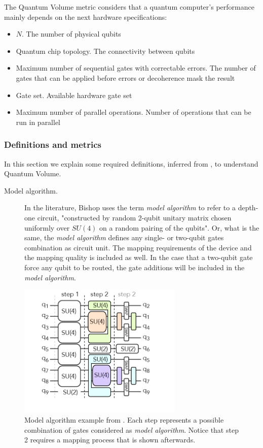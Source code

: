 \documentclass[11pt]{article}
\begin{document}
The Quantum Volume metric considers that a quantum computer's performance mainly depends on the next hardware specifications:

\begin{itemize}
\item \(N\). The number of physical qubits
\item Quantum chip topology. The connectivity between qubits
\item Maximum number of sequential gates with correctable errors. The number of gates that can be applied before errors or decoherence mask the result
\item Gate set. Available hardware gate set
\item Maximum number of parallel operations. Number of operations that can be run in parallel
\end{itemize}

\subsubsection{Definitions and metrics}
\label{sec:org78619bb}

In this section we explain some required definitions, inferred from \cite{Bishop_2017,Moll_2018}, to understand Quantum Volume.


\begin{description}
\item[{Model algorithm.}] In the literature, Bishop uses the term \emph{model algorithm} \cite{Bishop_2017} to refer to a depth-one circuit, "constructed by random 2-qubit unitary matrix chosen uniformly over \(SU (4)\) on a random pairing of the qubits". Or, what is the same, the \emph{model algorithm} defines any single- or two-qubit gates combination as circuit unit. The mapping requirements of the device and the mapping quality is included as well. In the case that a two-qubit gate force any qubit to be routed, the gate additions will be included in the \emph{model algorithm}.
\end{description}

\begin{figure}[htbp]
\centering
\includegraphics[width=0.7\textwidth]{model_algorithm.png}
\caption{\label{fig:org7953257}
Model algorithm example from \cite{Moll_2018}. Each step represents a possible combination of gates considered as \emph{model algorithm}. Notice that step 2 requires a mapping process that is shown afterwards.}
\end{figure}
\end{document}
